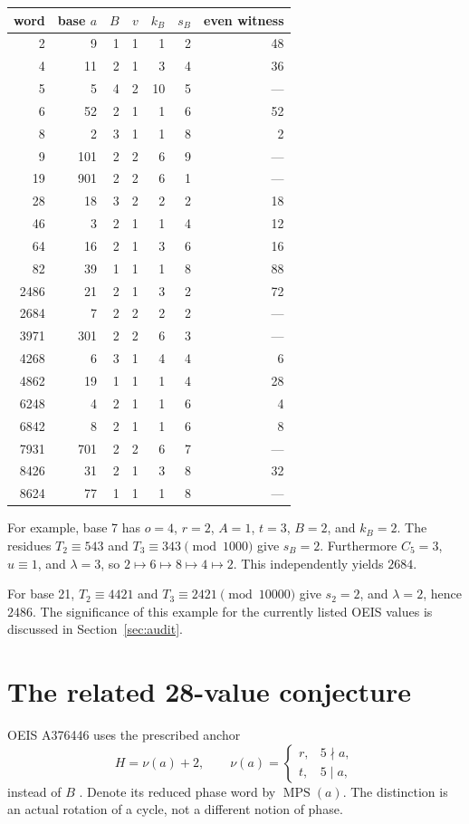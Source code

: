 \documentclass[11pt,letterpaper]{article}
\numberwithin{equation}{section}
\theoremstyle{definition}
\newcommand{\MPS}{\operatorname{MPS}}
\begin{document}
\begin{center}
\begin{tabular}{rrrrrrr}
\toprule
word & base $a$ & $B$ & $v$ & $k_B$ & $s_B$ & even witness\\
\midrule
2&9&1&1&1&2&48\\
4&11&2&1&3&4&36\\
5&5&4&2&10&5&---\\
6&52&2&1&1&6&52\\
8&2&3&1&1&8&2\\
9&101&2&2&6&9&---\\
19&901&2&2&6&1&---\\
28&18&3&2&2&2&18\\
46&3&2&1&1&4&12\\
64&16&2&1&3&6&16\\
82&39&1&1&1&8&88\\
2486&21&2&1&3&2&72\\
2684&7&2&2&2&2&---\\
3971&301&2&2&6&3&---\\
4268&6&3&1&4&4&6\\
4862&19&1&1&1&4&28\\
6248&4&2&1&1&6&4\\
6842&8&2&1&1&6&8\\
7931&701&2&2&6&7&---\\
8426&31&2&1&3&8&32\\
8624&77&1&1&1&8&---\\
\bottomrule
\end{tabular}
\end{center}

For example, base 7 has $o=4$, $r=2$, $A=1$, $t=3$, $B=2$, and $k_B=2$.
The residues $T_2\equiv543$ and $T_3\equiv343\pmod{1000}$ give $s_B=2$.
Furthermore $C_5=3$, $u\equiv1$, and $\lambda=3$, so
$2\mapsto6\mapsto8\mapsto4\mapsto2$. This independently yields $2684$.

For base 21, $T_2\equiv4421$ and $T_3\equiv2421\pmod{10000}$ give
$s_2=2$, and $\lambda=2$, hence $2486$. The significance of this example for
the currently listed OEIS values is discussed in Section~\ref{sec:audit}.

\section{The related 28-value conjecture}\label{sec:modular}
OEIS A376446 uses the prescribed anchor
\begin{equation}\label{eq:H}
 H=\nu(a)+2,\qquad
 \nu(a)=\begin{cases}r,&5\nmid a,\\t,&5\mid a,\end{cases}
\end{equation}
instead of $B$ \cite{oeis446}. Denote its reduced phase word by $\MPS(a)$.
The distinction is an actual rotation of a cycle, not a different notion of
phase.
\end{document}
